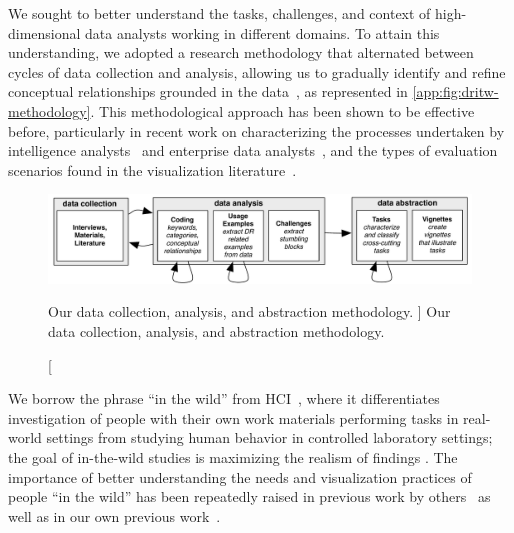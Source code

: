 We sought to better understand the tasks, challenges, and context of high-dimensional data analysts working in different domains.
To attain this understanding, we adopted a research methodology that alternated between cycles of data collection and analysis, allowing us to gradually identify and refine conceptual relationships grounded in the data~\cite{Charmaz2006}, as represented in \autoref{app:fig:dritw-methodology}. 
This methodological approach has been shown to be effective before, particularly in recent work on characterizing the processes undertaken by intelligence analysts~\cite{Kang2011} and enterprise data analysts~\cite{Kandel2012}, and the types of evaluation scenarios found in the visualization literature~\cite{Lam2012}. 


\begin{figure}
    \centering
    \includegraphics[width=\textwidth]{figures/dritw-methodology}
    \caption
    [
        Our data collection, analysis, and abstraction methodology.
    ]
    {
        Our data collection, analysis, and abstraction methodology. 
    }
    \label{app:fig:dritw-methodology}
    \centering
\end{figure}


We borrow the phrase ``in the wild'' from \ac{HCI}~\cite{Hollan2000}, where it differentiates investigation of people with their own work materials performing tasks in real-world settings from studying human behavior in controlled laboratory settings; the goal of in-the-wild studies is maximizing the realism of findings \cite{McGrath1995}. 
The importance of better understanding the needs and visualization practices of people ``in the wild'' has been repeatedly raised in previous work by others~\cite{Carpendale2008,Isenberg2008,Plaisant2004} as well as in our own previous work~\cite{Munzner2009,Sedlmair2011}.

